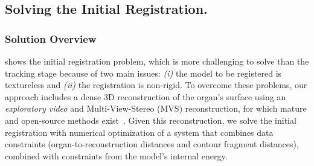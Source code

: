 
\subsection{Solving the Initial Registration.}
\label{sec:registrationOverview}

\subsubsection{Solution Overview}
 shows the initial registration problem, which is more challenging to solve than the tracking stage because of two main issues: \textit{(i)} the model to be registered is textureless and \textit{(ii)} the registration is non-rigid.
To overcome these problems, our approach includes a dense 3D reconstruction of the organ's surface using an \emph{exploratory video} and Multi-View-Stereo (MVS) reconstruction, for which mature and open-source methods exist~\cite{Meshroom}. Given this reconstruction, we solve the initial registration with numerical optimization of a system that combines data constraints (organ-to-reconstruction distances and contour fragment distances), combined with constraints from the model's internal energy.

